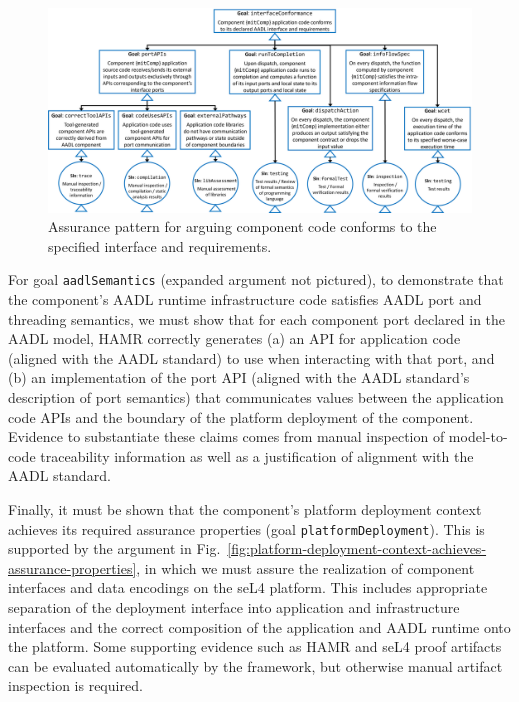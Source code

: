 \begin{figure}[h]
	\centering 
	\includegraphics[width=\textwidth]{figs/code-conforms-to-interface-and-requirements.png}
	\caption{Assurance pattern for arguing component code conforms to the specified interface and requirements.}
	\label{fig:code-conforms-to-interface-and-requirements} 
\end{figure}

For goal \texttt{aadlSemantics} (expanded argument not pictured), to demonstrate that the component's AADL runtime infrastructure code satisfies AADL port and threading semantics, we must show that for each component port declared in the AADL model, HAMR correctly generates (a) an API for application code (aligned with the AADL standard) to use when interacting with that port,
and (b) an implementation of the port API (aligned with the AADL standard's description of port semantics) that communicates values between the application code APIs and the boundary of the platform deployment of the component.  Evidence to substantiate these claims comes from manual inspection of model-to-code traceability information as well as a justification of alignment with the AADL standard.

Finally, it must be shown that the component's platform deployment context achieves its required assurance properties (goal \texttt{platformDeployment}).  This is supported by the argument in Fig.~\ref{fig:platform-deployment-context-achieves-assurance-properties}, in which we must assure the realization of component interfaces and data encodings on the seL4 platform.  This includes appropriate separation of the deployment interface into application and infrastructure interfaces and the correct composition of the application and AADL runtime onto the platform.  Some supporting evidence such as HAMR and seL4 proof artifacts can be evaluated automatically by the framework, but otherwise manual artifact inspection is required.

